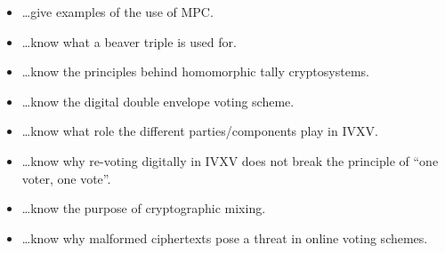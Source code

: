 \documentclass[usegeometry,parskip=half]{scrartcl}
\begin{document}
\begin{itemize}
  \item \dots{}give examples of the use of MPC.
  \item \dots{}know what a beaver triple is used for.
  \item \dots{}know the principles behind homomorphic tally cryptosystems.
  \item \dots{}know the digital double envelope voting scheme.
  \item \dots{}know what role the different parties/components play in IVXV.
  \item \dots{}know why re-voting digitally in IVXV does not break the principle of \enquote{one voter, one vote}.
  \item \dots{}know the purpose of cryptographic mixing.
  \item \dots{}know why malformed ciphertexts pose a threat in online voting schemes.
\end{itemize}
\end{document}
